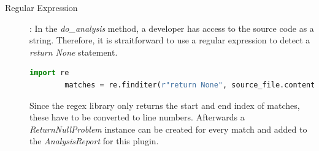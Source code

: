 \begin{description}
    \item[Regular Expression]: In the \textit{do\_analysis} method, a developer has access to the source code as a string. Therefore, it is straitforward to use a regular expression to detect a \textit{return None} statement.
    \begin{lstlisting}[language=Python]
        import re
        matches = re.finditer(r"return None", source_file.content, re.MULTILINE | re.DOTALL)
    \end{lstlisting}
    Since the regex library only returns the start and end index of matches, these have to be converted to line numbers. Afterwards a \textit{ReturnNullProblem} instance can be created for every match and added to the \textit{AnalysisReport} for this plugin.


\end{description}
